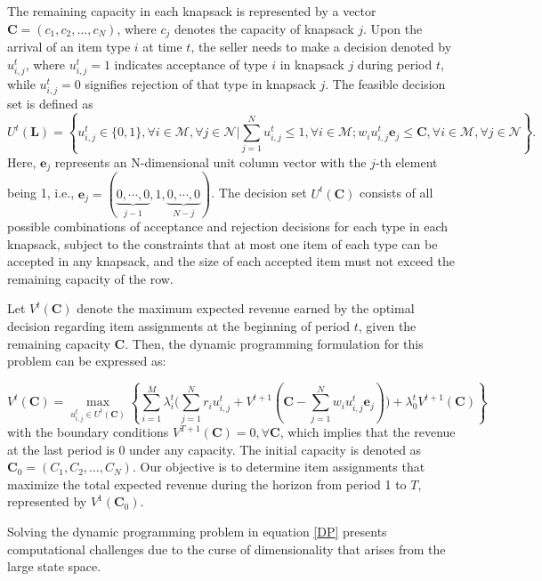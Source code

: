 The remaining capacity in each knapsack is represented by a vector $\mathbf{C} = (c_1, c_2, \ldots, c_N)$, where $c_j$ denotes the capacity of knapsack $j$. Upon the arrival of an item type $i$ at time $t$, the seller needs to make a decision denoted by $u_{i,j}^{t}$, where $u_{i,j}^{t} = 1$ indicates acceptance of type $i$ in knapsack $j$ during period $t$, while $u_{i,j}^{t} = 0$ signifies rejection of that type in knapsack $j$. The feasible decision set is defined as $$U^{t}(\mathbf{L}) = \left\{u_{i,j}^{t} \in \{0,1\}, \forall i \in \mathcal{M}, \forall j \in \mathcal{N} \bigg| \sum_{j=1}^{N} u_{i,j}^{t} \leq 1, \forall i \in \mathcal{M}; w_{i}u_{i,j}^{t}\mathbf{e}_j \leq \mathbf{C}, \forall i \in \mathcal{M}, \forall j \in \mathcal{N}\right\}.$$
Here, $\mathbf{e}_j$ represents an N-dimensional unit column vector with the $j$-th element being 1, i.e., $\mathbf{e}_j = (\underbrace{0, \cdots, 0}_{j-1}, 1, \underbrace{0, \cdots, 0}_{N-j})$. The decision set $U^{t}(\mathbf{C})$ consists of all possible combinations of acceptance and rejection decisions for each type in each knapsack, subject to the constraints that at most one item of each type can be accepted in any knapsack, and the size of each accepted item must not exceed the remaining capacity of the row.

Let $V^{t}(\mathbf{C})$ denote the maximum expected revenue earned by the optimal decision regarding item assignments at the beginning of period $t$, given the remaining capacity $\mathbf{C}$. Then, the dynamic programming formulation for this problem can be expressed as:

\begin{equation}\label{DP}
V^{t}(\mathbf{C}) = \max_{u_{i,j}^{t} \in U^{t}(\mathbf{C})}\left\{\sum_{i=1}^{M} \lambda_i^{t} \bigl( \sum_{j=1}^{N} r_i u_{i,j}^{t} + V^{t+1}(\mathbf{C} - \sum_{j=1}^{N} w_i u_{i,j}^{t}\mathbf{e}_j)\bigr) + \lambda_0^{t} V^{t+1}(\mathbf{C})\right\}
\end{equation}
with the boundary conditions $V^{T+1}(\mathbf{C}) = 0, \forall \mathbf{C}$, which implies that the revenue at the last period is 0 under any capacity. The initial capacity is denoted as $\mathbf{C}_{0} = (C_1, C_2, \ldots, C_N)$. Our objective is to determine item assignments that maximize the total expected revenue during the horizon from period 1 to $T$, represented by $V^{1}(\mathbf{C}_{0})$.


Solving the dynamic programming problem in equation \eqref{DP} presents computational challenges due to the curse of dimensionality that arises from the large state space.

